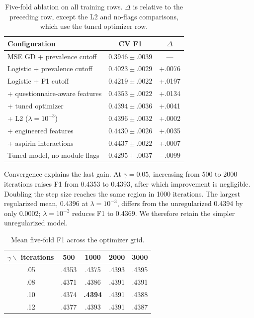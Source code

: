 \documentclass[10pt,conference,compsocconf]{IEEEtran}
\begin{document}
\begin{table}[t]
  \centering
  \caption{Five-fold ablation on all training rows.  $\Delta$ is relative to
  the preceding row, except the L2 and no-flags comparisons, which use the
  tuned optimizer row.}
  \label{tab:ablation}
  \small
  \setlength{\tabcolsep}{3pt}
  \begin{tabular}{lcc}
    \toprule
    Configuration & CV F1 & $\Delta$ \\
    \midrule
    MSE GD + prevalence cutoff & $0.3946\pm.0039$ & --- \\
    Logistic + prevalence cutoff & $0.4023\pm.0029$ & +.0076 \\
    Logistic + F1 cutoff & $0.4219\pm.0022$ & +.0197 \\
    + questionnaire-aware features & $0.4353\pm.0022$ & +.0134 \\
    + tuned optimizer & $0.4394\pm.0036$ & +.0041 \\
    + L2 ($\lambda=10^{-3}$) & $0.4396\pm.0032$ & +.0002 \\
    + engineered features & $0.4430\pm.0026$ & +.0035 \\
    + aspirin interactions & $\mathbf{0.4437\pm.0022}$ & +.0007 \\
    \addlinespace
    Tuned model, no module flags & $0.4295\pm.0037$ & $-.0099$ \\
    \bottomrule
  \end{tabular}
\end{table}

Convergence explains the last gain.  At $\gamma=0.05$, increasing from 500 to
2000 iterations raises F1 from 0.4353 to 0.4393, after which improvement is
negligible.  Doubling the step size reaches the same region in 1000 iterations.
The largest regularized mean, 0.4396 at $\lambda=10^{-3}$, differs from the
unregularized 0.4394 by only 0.0002; $\lambda=10^{-2}$ reduces F1 to 0.4369.
We therefore retain the simpler unregularized model.

\begin{table}[t]
  \centering
  \caption{Mean five-fold F1 across the optimizer grid.}
  \label{tab:tuning}
  \scriptsize
  \setlength{\tabcolsep}{3pt}
  \begin{tabular}{ccccc}
    \toprule
    $\gamma\backslash$ iterations & 500 & 1000 & 2000 & 3000 \\
    \midrule
    .05 & .4353 & .4375 & .4393 & .4395 \\
    .08 & .4371 & .4386 & .4391 & .4391 \\
    .10 & .4374 & \textbf{.4394} & .4391 & .4388 \\
    .12 & .4377 & .4393 & .4391 & .4387 \\
    \bottomrule
  \end{tabular}
\end{table}
\end{document}
